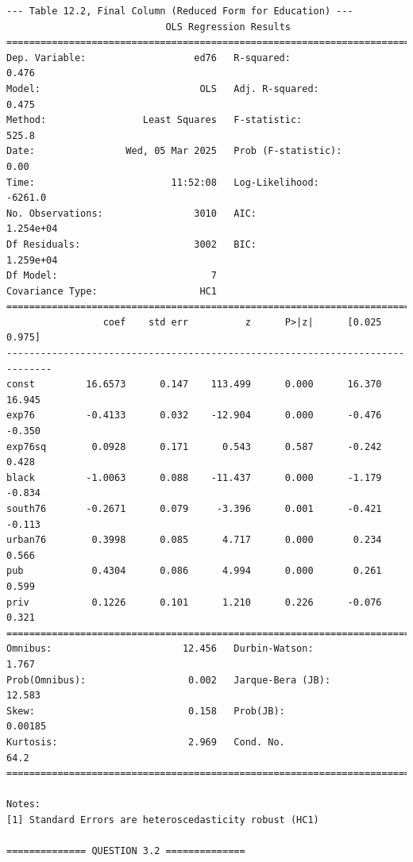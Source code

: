 \documentclass[10pt]{article}
\begin{document}
\begin{verbatim}
--- Table 12.2, Final Column (Reduced Form for Education) ---
                            OLS Regression Results                            
==============================================================================
Dep. Variable:                   ed76   R-squared:                       0.476
Model:                            OLS   Adj. R-squared:                  0.475
Method:                 Least Squares   F-statistic:                     525.8
Date:                Wed, 05 Mar 2025   Prob (F-statistic):               0.00
Time:                        11:52:08   Log-Likelihood:                -6261.0
No. Observations:                3010   AIC:                         1.254e+04
Df Residuals:                    3002   BIC:                         1.259e+04
Df Model:                           7                                         
Covariance Type:                  HC1                                         
==============================================================================
                 coef    std err          z      P>|z|      [0.025      0.975]
------------------------------------------------------------------------------
const         16.6573      0.147    113.499      0.000      16.370      16.945
exp76         -0.4133      0.032    -12.904      0.000      -0.476      -0.350
exp76sq        0.0928      0.171      0.543      0.587      -0.242       0.428
black         -1.0063      0.088    -11.437      0.000      -1.179      -0.834
south76       -0.2671      0.079     -3.396      0.001      -0.421      -0.113
urban76        0.3998      0.085      4.717      0.000       0.234       0.566
pub            0.4304      0.086      4.994      0.000       0.261       0.599
priv           0.1226      0.101      1.210      0.226      -0.076       0.321
==============================================================================
Omnibus:                       12.456   Durbin-Watson:                   1.767
Prob(Omnibus):                  0.002   Jarque-Bera (JB):               12.583
Skew:                           0.158   Prob(JB):                      0.00185
Kurtosis:                       2.969   Cond. No.                         64.2
==============================================================================

Notes:
[1] Standard Errors are heteroscedasticity robust (HC1)

============== QUESTION 3.2 ==============


\end{verbatim}
\end{document}
